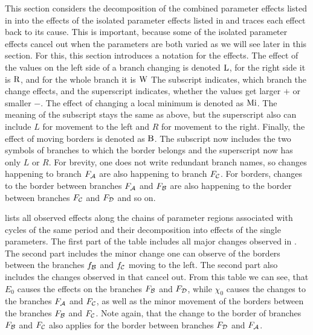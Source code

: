 This section considers the decomposition of the combined parameter effects listed in  into the effects of the isolated parameter effects listed in  and traces each effect back to its cause.
This is important, because some of the isolated parameter effects cancel out when the parameters are both varied as we will see later in this section.
For this, this section introduces a notation for the effects.
The effect of the values on the left side of a branch changing is denoted $\operatorname{L}$, for the right side it is $\operatorname{R}$, and for the whole branch it is $\operatorname{W}$
The subscript indicates, which branch the change effects, and the superscript indicates, whether the values get larger $+$ or smaller $-$.
The effect of changing a local minimum is denoted as $\operatorname{Mi}$.
The meaning of the subscript stays the same as above, but the superscript also can include $L$ for movement to the left and $R$ for movement to the right.
Finally, the effect of moving borders is denoted as $\operatorname{B}$.
The subscript now includes the two symbols of branches to which the border belongs and the superscript now has only $L$ or $R$.
For brevity, one does not write redundant branch names, so changes happening to branch $F_{\mathcal{A}}$ are also happening to branch $F_{\mathcal{C}}$.
For borders, changes to the border between branches $F_{\mathcal{A}}$ and $F_{\mathcal{B}}$ are also happening to the border between branches $F_{\mathcal{C}}$ and $F_{\mathcal{D}}$ and so on.

 lists all observed effects along the chains of parameter regions associated with cycles of the same period and their decomposition into effects of the single parameters.
The first part of the table includes all major changes observed in .
The second part includes the minor change one can observe of the borders between the branches $f_{\mathcal{B}}$ and $f_{\mathcal{C}}$ moving to the left.
The second part also includes the changes observed in  that cancel out.
From this table we can see, that $E_0$ causes the effects on the branches $F_{\mathcal{B}}$ and $F_{\mathcal{D}}$, while $\chi_0$ causes the changes to the branches $F_{\mathcal{A}}$ and $F_{\mathcal{C}}$, as well as the minor movement of the borders between the branches $F_{\mathcal{B}}$ and $F_{\mathcal{C}}$.
Note again, that the change to the border of branches $F_{\mathcal{B}}$ and $F_{\mathcal{C}}$ also applies for the border between branches $F_{\mathcal{D}}$ and $F_{\mathcal{A}}$.

